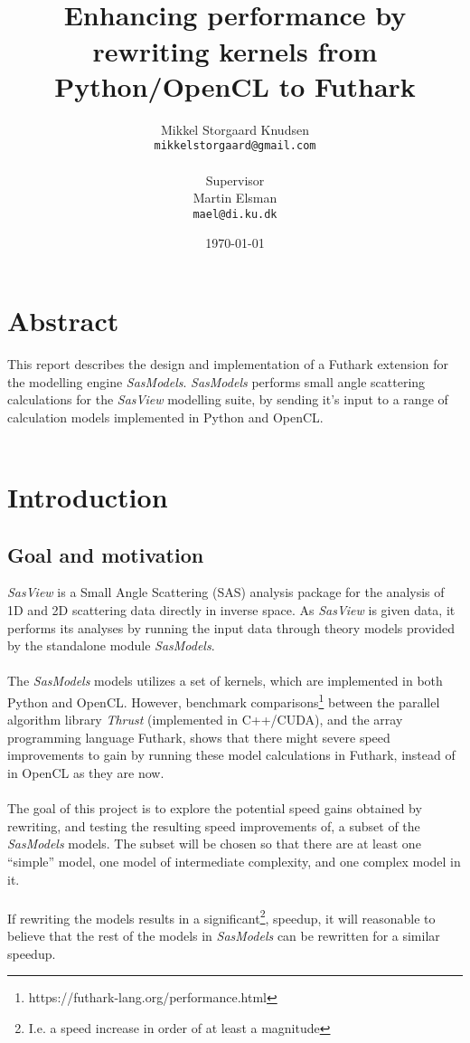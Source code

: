 \documentclass[11pt]{article}
\title{
  \vspace{3cm}
  \Huge{\futhark}\\
  \Large{Enhancing performance by rewriting kernels from Python/OpenCL to
    Futhark}
}
\author{
  \Large{Mikkel Storgaard Knudsen}\\
  \texttt{mikkelstorgaard@gmail.com}\\
  \\
  \Large{Supervisor}\\
  Martin Elsman\\
  \texttt{mael@di.ku.dk}
}
\date{
    \today
}
\def \ColourPDF {include/ku-farve}
\def \TitlePDF   {include/ku-en}  %
\newcommand{\sasmodels}{\textit{SasModels}}
\newcommand{\sasview}{\textit{SasView}}
\begin{document}


\clearpage\maketitle
\thispagestyle{empty}

\section*{Abstract}
This report describes the design and implementation of a Futhark extension for
the modelling engine \sasmodels.
\sasmodels{} performs small angle scattering calculations for the \sasview{}
modelling suite, by sending it's input to a range of calculation models
implemented in Python and OpenCL.\\\\





\newpage

\section{Introduction}
\subsection{Goal and motivation}
\sasview{} is a Small Angle Scattering (SAS) analysis package for the
analysis of 1D and 2D scattering data directly in inverse space.
As \sasview{} is given data, it performs its analyses by running the
input data through theory models provided by the standalone module
\sasmodels{}.
\\\\
The \sasmodels{} models utilizes a set of kernels, which are implemented
in both Python and OpenCL. However, benchmark
comparisons\footnote{https://futhark-lang.org/performance.html}
between the parallel algorithm library \textit{Thrust}
(implemented in C++/CUDA), and the array programming language Futhark, shows
that there might severe speed improvements to gain by running these model
calculations in Futhark, instead of in OpenCL as they are now.
\\\\
The goal of this project is to explore the potential speed gains obtained by
rewriting, and testing the resulting speed improvements of, a subset of the
\sasmodels{} models.
The subset will be chosen so that there are at least
one ``simple'' model, one model of intermediate complexity, and one complex
model in it.
\\\\
If rewriting the models results in a significant\footnote{I.e. a speed increase
  in order of at least a magnitude}, speedup, it will reasonable to believe that 
  the rest of the models in \sasmodels{} can be rewritten for a similar
  speedup.
\end{document}
